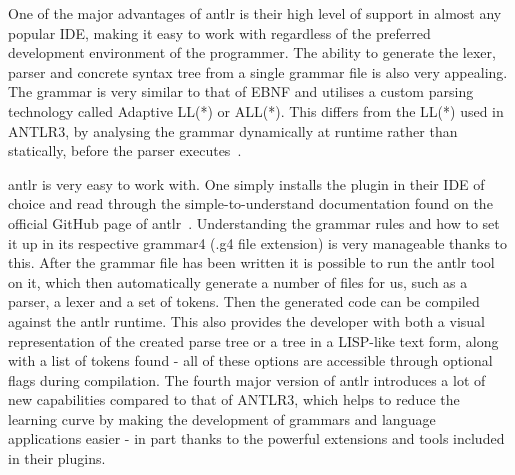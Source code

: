 One of the major advantages of \gls{antlr} is their high level of support in almost any popular IDE, making it easy to work with regardless of the preferred development environment of the programmer. The ability to generate the lexer, parser and concrete syntax tree from a single grammar file is also very appealing. The grammar is very similar to that of EBNF and utilises a custom parsing technology called Adaptive LL(*) or ALL(*). This differs from the LL(*) used in ANTLR3, by analysing the grammar dynamically at runtime rather than statically, before the parser executes~\cite{Parr2014}.

\gls{antlr} is very easy to work with. One simply installs the plugin in their IDE of choice and read through the simple-to-understand documentation found on the official GitHub page of \gls{antlr}~\cite{ANTLR_Documentation}. Understanding the grammar rules and how to set it up in its respective grammar4 (.g4 file extension) is very manageable thanks to this. After the grammar file has been written it is possible to run the \gls{antlr} tool on it, which then automatically generate a number of files for us, such as a parser, a lexer and a set of tokens. Then the generated code can be compiled against the \gls{antlr} runtime. This also provides the developer with both a visual representation of the created parse tree or a tree in a LISP-like text form, along with a list of tokens found - all of these options are accessible through optional flags during compilation. The fourth major version of \gls{antlr} introduces a lot of new capabilities compared to that of ANTLR3, which helps to reduce the learning curve by making the development of grammars and language applications easier - in part thanks to the powerful extensions and tools included in their plugins.

